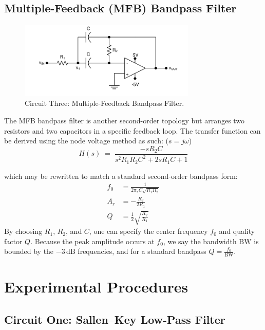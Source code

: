 \documentclass[12pt]{article}
\begin{document}
\subsection{Multiple-Feedback (MFB) Bandpass Filter}

\begin{figure}[H]
	\centering
	\includegraphics[width=0.75\textwidth]{07_multfeed}
	\caption{Circuit Three: Multiple-Feedback Bandpass Filter.}
	\label{fig:multfeed}
\end{figure}

The MFB bandpass filter is another second-order topology but arranges two
resistors and two capacitors in a specific feedback loop. The transfer function can be derived using the node voltage method as such: ($s = j\omega$)
\begin{equation*}
	H(s) \;=\;
	\frac{-sR_2C}
	{s^2R_1R_2C^2 + 2sR_1C + 1}
\end{equation*}

which may be rewritten to match a standard second-order bandpass form:
\begin{align*}
	f_0 & = \frac{1}{2\pi,C\sqrt{R_1R_2}}     \\
	A_r & = -\frac{R_2}{2R_1}                 \\
	Q   & = \frac{1}{2}\sqrt{\frac{R_2}{R_1}}
\end{align*}
By choosing $R_1$, $R_2$, and $C$, one can specify the center frequency $f_0$ and
quality factor $Q$. Because the peak amplitude occurs at $f_0$, we say the
bandwidth $\mathrm{BW}$ is bounded by the $-3\,\mathrm{dB}$ frequencies, and for
a standard bandpass $Q = \tfrac{f_0}{\mathrm{BW}}$.

\section{Experimental Procedures}

\subsection{Circuit One: Sallen--Key Low-Pass Filter}
\end{document}
